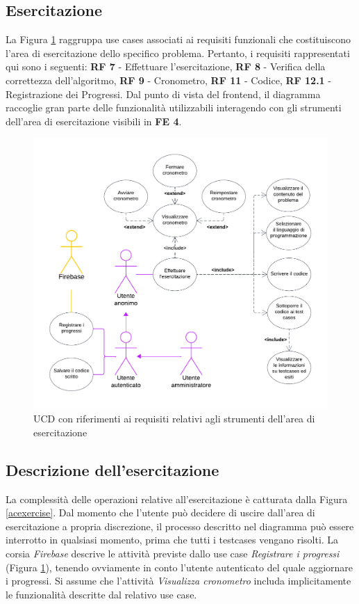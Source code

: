 \documentclass[11pt, a4paper]{article}
\theoremstyle{definition} %
\begin{document}
\newpage
\subsection{Esercitazione}
La Figura \ref{esercitaz} raggruppa use cases associati ai requisiti funzionali
che costituiscono l'area di esercitazione dello specifico problema. Pertanto,
i requisiti rappresentati qui sono i seguenti: \textbf{RF 7} - Effettuare l'esercitazione,
\textbf{RF 8} - Verifica della correttezza dell'algoritmo, \textbf{RF 9} - Cronometro,
\textbf{RF 11} - Codice, \textbf{RF 12.1} - Registrazione dei Progressi. Dal punto di
vista del frontend, il diagramma raccoglie gran parte delle funzionalità utilizzabili
interagendo con gli strumenti dell'area di esercitazione visibili in \textbf{FE 4}.

\begin{figure}[H]
\centering
\hspace*{-2cm}
\includegraphics[scale = 0.95]{materiale/ucdiagrams/ucesercitazione.pdf}
\caption{UCD con riferimenti ai requisiti relativi agli strumenti dell'area di esercitazione}
\label{esercitaz}
\end{figure}

\newpage
\subsection*{Descrizione dell'esercitazione}
La complessità delle operazioni relative all'esercitazione è
catturata dalla Figura \ref{acexercise}.
Dal momento che l'utente può decidere di uscire dall'area di esercitazione
a propria discrezione, il processo descritto nel diagramma
può essere interrotto in qualsiasi momento, prima che tutti i
testcases vengano risolti.
La corsia \textit{Firebase} descrive le
attività previste dallo use case \textit{Registrare i progressi}
(Figura \ref{esercitaz}), tenendo ovviamente in conto l'utente
autenticato del quale aggiornare i progressi.
Si assume che l'attività \textit{Visualizza cronometro} includa
implicitamente le funzionalità descritte dal relativo use case.
\end{document}
